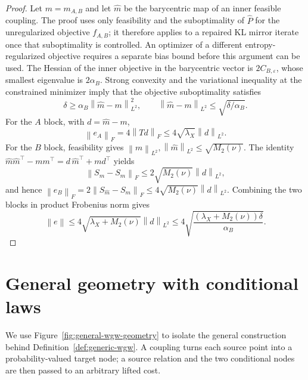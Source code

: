 \documentclass[11pt]{article}
\newcommand{\norm}[1]{\left\lVert #1\right\rVert}
\theoremstyle{plain}
\theoremstyle{definition}
\theoremstyle{remark}
\begin{document}
\begin{proof}
Let $m=m_{A,B}$ and let $\widehat m$ be the barycentric map of an inner feasible
coupling. The proof uses only feasibility and the suboptimality of $\widehat P$
for the unregularized objective $f_{A,B}$; it therefore applies to a repaired KL
mirror iterate once that suboptimality is controlled. An optimizer of a different
entropy-regularized objective requires a separate bias bound before this argument
can be used. The Hessian of the inner objective in the barycentric vector is
$2C_{B,\varepsilon}$, whose
smallest eigenvalue is $2\alpha_B$. Strong convexity and the variational inequality
at the constrained minimizer imply that the objective suboptimality satisfies
\[
 \delta\ge\alpha_B\norm{\widehat m-m}_{L^2}^2,
 \qquad
 \norm{\widehat m-m}_{L^2}\le\sqrt{\delta/\alpha_B}.
\]
For the $A$ block, with $d=\widehat m-m$,
\[
 \norm{e_A}_F=4\norm{Td}_F
 \le4\sqrt{\lambda_X}\norm d_{L^2}.
\]
For the $B$ block, feasibility gives
$\norm{m}_{L^2},\norm{\widehat m}_{L^2}\le\sqrt{M_2(\nu)}$.  The identity
$\widehat m\widehat m^\top-mm^\top=d\,\widehat m^\top+md^\top$ yields
\[
 \norm{S_{\widehat m}-S_m}_F
 \le2\sqrt{M_2(\nu)}\norm d_{L^2},
\]
and hence
$\norm{e_B}_F=2\norm{S_{\widehat m}-S_m}_F
\le4\sqrt{M_2(\nu)}\norm d_{L^2}$.  Combining the two blocks in product
Frobenius norm gives
\[
 \norm e\le4\sqrt{\lambda_X+M_2(\nu)}\norm d_{L^2}
 \le4\sqrt{\frac{(\lambda_X+M_2(\nu))\delta}{\alpha_B}}.
\]
\end{proof}


\section{General geometry with conditional laws}\label{app:general-wgw-geometry}

We use Figure~\ref{fig:general-wgw-geometry} to isolate the general construction behind
Definition~\ref{def:generic-wgw}. A coupling turns each source point into a
probability-valued target node; a source relation and the two conditional nodes are
then passed to an arbitrary lifted cost.
\end{document}
